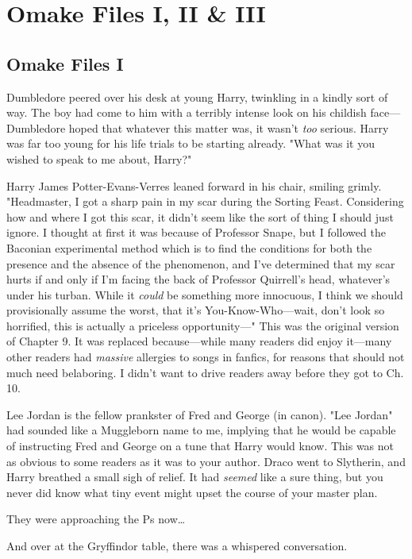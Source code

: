 \chapter{Omake Files I, II \& III}

\section{Omake Files I}
Dumbledore peered over his desk at young Harry, twinkling in a kindly sort of
way. The boy had come to him with a terribly intense look on his childish
face---Dumbledore hoped that whatever this matter was, it wasn't \emph{too}
serious. Harry was far too young for his life trials to be starting already.
"What was it you wished to speak to me about, Harry?"

Harry James Potter-Evans-Verres leaned forward in his chair, smiling grimly.
"Headmaster, I got a sharp pain in my scar during the Sorting Feast.
Considering how and where I got this scar, it didn't seem like the sort of
thing I should just ignore. I thought at first it was because of Professor
Snape, but I followed the Baconian experimental method which is to find the
conditions for both the presence and the absence of the phenomenon, and I've
determined that my scar hurts if and only if I'm facing the back of Professor
Quirrell's head, whatever's under his turban. While it \emph{could} be
something more innocuous, I think we should provisionally assume the worst,
that it's You-Know-Who---wait, don't look so horrified, this is actually a
priceless opportunity---"
This was the original version of Chapter 9. It was replaced because---while
many readers did enjoy it---many other readers had \emph{massive} allergies to
songs in fanfics, for reasons that should not much need belaboring. I didn't
want to drive readers away before they got to Ch. 10.

Lee Jordan is the fellow prankster of Fred and George (in canon). "Lee Jordan"
had sounded like a Muggleborn name to me, implying that he would be capable of
instructing Fred and George on a tune that Harry would know. This was not as
obvious to some readers as it was to your author.
\later
Draco went to Slytherin, and Harry breathed a small sigh of relief. It had
\emph{seemed} like a sure thing, but you never did know what tiny event might
upset the course of your master plan.

They were approaching the Ps now{\ldots}

And over at the Gryffindor table, there was a whispered conversation.

